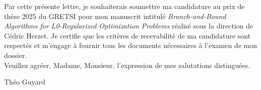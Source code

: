 \documentclass[11pt]{article}
\begin{document}
\vspace*{20pt}

Par cette présente lettre, je souhaiterais soumettre ma candidature au prix de thèse 2025 du GRETSI pour mon manuscrit intitulé \textit{Branch-and-Bound Algorithms for L0-Regularized Optimization Problems} réalisé sous la direction de Cédric Herzet.
Je certifie que les critères de recevabilité de ma candidature sont respectés et m'engage à fournir tous les documents nécessaires à l'examen de mon dossier.
~\\

Veuillez agréer, Madame, Monsieur, l'expression de mes salutations distinguées.

\vspace*{50pt}
\begin{flushright}
    Théo Guyard
\end{flushright}
\end{document}
